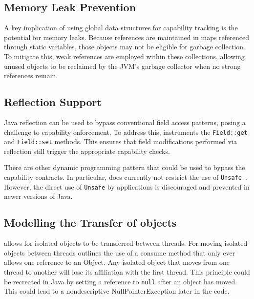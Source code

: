 \subsection{Memory Leak Prevention}

A key implication of using global data structures for capability tracking is the potential for memory leaks. Because references are maintained in maps referenced through static variables, those objects may not be eligible for garbage collection. To mitigate this, weak references are employed within these collections, allowing unused objects to be reclaimed by the JVM's garbage collector when no strong references remain.


\subsection{Reflection Support}

Java reflection can be used to bypass conventional field access patterns, posing a challenge to capability enforcement. To address this, \jdala instruments the \texttt{Field::get} and \texttt{Field::set} methods. This ensures that field modifications performed via reflection still trigger the appropriate capability checks.

There are other dynamic programming pattern that could be used to bypass the capability contracts. In particular, \jdala does currently  not restrict the use of \texttt{Unsafe}~\cite{mastrangelo2015use}. However, the direct use of \texttt{Unsafe} by applications is discouraged and prevented in newer versions of Java.


\subsection{Modelling the Transfer of \Isolated objects}

\dala allows for isolated objects to be transferred between threads.
For moving isolated objects between threads \dala outlines the use of a consume method that only ever allows one reference to an Object. 
Any isolated object that moves from one thread to another will lose its affiliation with the first thread. This principle could be recreated in Java by setting a reference to \texttt{null} after an object has moved. This could lead to a nondescriptive NullPointerException later in the code.

